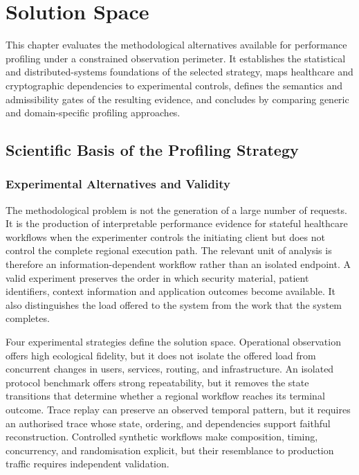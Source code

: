 \chapter{Solution Space}
\label{chap:stateofart}
\noindent This chapter evaluates the methodological alternatives available for
performance profiling under a constrained observation perimeter. It establishes
the statistical and distributed-systems foundations of the selected strategy,
maps healthcare and cryptographic dependencies to experimental controls,
defines the semantics and admissibility gates of the resulting evidence, and
concludes by comparing generic and domain-specific profiling approaches.

\section{Scientific Basis of the Profiling Strategy}
\subsection{Experimental Alternatives and Validity}

\noindent The methodological problem is not the generation of a large number of
requests. It is the production of interpretable performance evidence for
stateful healthcare workflows when the experimenter controls the initiating
client but does not control the complete regional execution path. The relevant
unit of analysis is therefore an information-dependent workflow rather than an
isolated endpoint. A valid experiment preserves the order in which security
material, patient identifiers, context information and application outcomes become available.
It also distinguishes the load offered to the system from the work that the system completes.

\noindent Four experimental strategies define the solution space. Operational observation
offers high ecological fidelity, but it does not isolate the offered load from
concurrent changes in users, services, routing, and infrastructure. An isolated
protocol benchmark offers strong repeatability, but it removes the state
transitions that determine whether a regional workflow reaches its terminal
outcome. Trace replay can preserve an observed temporal pattern, but it requires
an authorised trace whose state, ordering, and dependencies support faithful
reconstruction. Controlled synthetic workflows make composition, timing,
concurrency, and randomisation explicit, but their resemblance to production
traffic requires independent validation.

